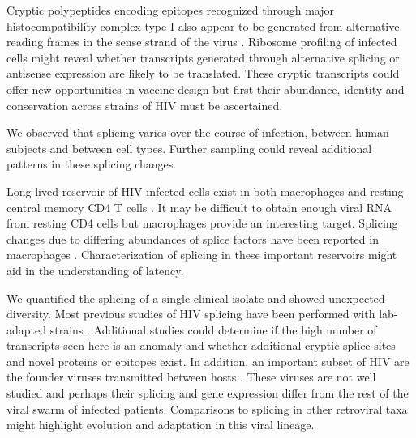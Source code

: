 \documentclass[../sherrill-Mix_thesis.tex]{subfiles}
\begin{document}
	Cryptic polypeptides encoding epitopes recognized through major histocompatibility complex type I also appear to be generated from alternative reading frames in the sense strand of the virus \citep{Cardinaud2004,Berger2010}. Ribosome profiling \citep{Ingolia2009,Ingolia2011,Ingolia2014} of infected cells might reveal whether transcripts generated through alternative splicing or antisense expression are likely to be translated. These cryptic transcripts could offer new opportunities in vaccine design \citep{Bansal2010,Maness2010,Bet2015,Berger2015} but first their abundance, identity and conservation across strains of HIV must be ascertained.
	
	We observed that splicing varies over the course of infection, between human subjects and between cell types. Further sampling could reveal additional patterns in these splicing changes. 
	
	Long-lived reservoir of HIV infected cells exist in both macrophages \citep{Koenig1986,Sonza2001} and resting central memory CD4 T cells \citep{Chun1995,Chun1997,Finzi1997,Hermankova2003,Soriano-Sarabia2014}. It may be difficult to obtain enough viral RNA from resting CD4 cells \citep{Hermankova2003} but macrophages provide an interesting target. Splicing changes due to differing abundances of splice factors have been reported in macrophages \citep{Dowling2008}. Characterization of splicing in these important reservoirs might aid in the understanding of latency.
	
	We quantified the splicing of a single clinical isolate and showed unexpected diversity. Most previous studies of HIV splicing have been performed with lab-adapted strains \citep{Purcell1993}. Additional studies could determine if the high number of transcripts seen here is an anomaly and whether additional cryptic splice sites and novel proteins or epitopes exist. In addition, an important subset of HIV are the founder viruses transmitted between hosts \citep{Keele2008,Salazar-Gonzalez2009}. These viruses are not well studied and perhaps their splicing and gene expression differ from the rest of the viral swarm of infected patients. Comparisons to splicing in other retroviral taxa might highlight evolution and adaptation in this viral lineage.

\end{document}
